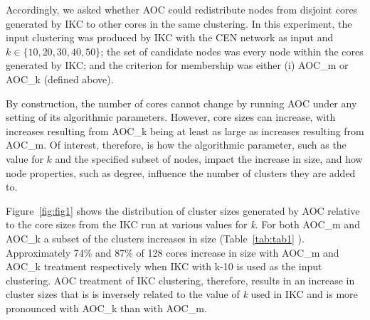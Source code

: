 \documentclass[12pt, oneside]{article}   	%
\begin{document}
Accordingly, we asked whether AOC could redistribute nodes from disjoint cores generated by IKC to other cores in the same clustering. 
In this experiment, the input clustering was produced by IKC with the CEN network as input and $k \in \{10, 20, 30, 40, 50\}$; the set of candidate nodes was every node within the cores generated by IKC; and the criterion for membership was either (i) AOC\_m or AOC\_k (defined above).

By construction, the number of cores cannot change by running AOC  under any setting of its algorithmic parameters. However, core sizes can increase, with increases resulting from AOC\_k being at least as large as increases resulting from AOC\_m.
Of interest, therefore, is how the algorithmic parameter, such as the value for $k$ and the specified subset of nodes, impact the increase in size, and how node properties, such as degree, influence the number of clusters they are added to.

Figure~\ref{fig:fig1} shows the distribution of cluster sizes generated by AOC relative to the core sizes from the IKC run at various values for \emph{k}. For both AOC\_m and AOC\_k a subset of the clusters increases in size (Table~\ref{tab:tab1} ).
Approximately 74\% and 87\% of  128 cores increase in size with AOC\_m and AOC\_k treatment respectively when IKC with k-10 is used as the input clustering. AOC treatment of IKC clustering, therefore, results in an increase in cluster sizes that is is inversely related to the value of \emph{k} used in IKC and is more pronounced with AOC\_k than with AOC\_m. 
\end{document}
